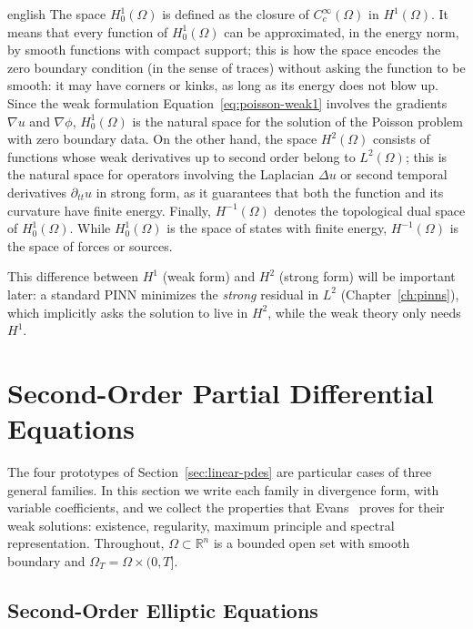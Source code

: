 \documentclass[0000.tex]{subfiles}
\begin{document}
\begin{hyphenrules}{english}
The space $H^1_0(\Omega)$ is defined as the closure of $C_c^\infty(\Omega)$ in $H^1(\Omega)$. It means
that every function of $H^1_0(\Omega)$ can be approximated, in the energy norm, by smooth functions with
compact support; this is how the space encodes the zero boundary condition (in the sense of traces)
without asking the function to be smooth: it may have corners or kinks, as long as its energy does not
blow up. Since the weak formulation Equation~\eqref{eq:poisson-weak1} involves the gradients $\nabla u$ and
$\nabla\phi$, $H^1_0(\Omega)$ is the natural space for the solution of the Poisson problem with zero
boundary data. On the other hand, the space $H^2(\Omega)$ consists of functions whose weak derivatives
up to second order belong to $L^2(\Omega)$; this is the natural space for operators involving the
Laplacian $\Delta u$ or second temporal derivatives $\partial_{tt}u$ in strong form, as it guarantees
that both the function and its curvature have finite energy. Finally, $H^{-1}(\Omega)$ denotes the
topological dual space of $H^1_0(\Omega)$. While $H^1_0(\Omega)$ is the space of states with finite
energy, $H^{-1}(\Omega)$ is the space of forces or sources.

This difference between $H^1$ (weak form) and $H^2$ (strong form) will be important later: a standard
PINN minimizes the \emph{strong} residual in $L^2$ (Chapter~\ref{ch:pinns}), which implicitly asks the
solution to live in $H^2$, while the weak theory only needs $H^1$.

\section{Second-Order Partial Differential Equations}\label{sec:second-order}

The four prototypes of Section~\ref{sec:linear-pdes} are particular cases of three general families. In this
section we write each family in divergence form, with variable coefficients, and we collect the
properties that Evans~\cite{evans2010} proves for their weak solutions: existence, regularity, maximum
principle and spectral representation. Throughout, $\Omega\subset\mathbb{R}^n$ is a bounded open set with
smooth boundary and $\Omega_T=\Omega\times(0,T]$.

\subsection{Second-Order Elliptic Equations}\label{subsec:elliptic}


\end{hyphenrules}
\end{document}
